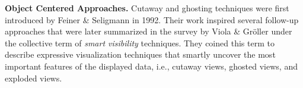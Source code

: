 \noindent
\textbf{Object Centered Approaches.}
Cutaway and ghosting techniques were first introduced by Feiner \& Seligmann \cite{feiner92} in 1992.
Their work inspired several follow-up approaches \cite{diep02, diep03, weiskopf03, viola2004importance, Viola05, Kruger05} that were later summarized in the survey by Viola \& Gr{\"o}ller \cite{violasmart05} under the collective term of \textit{smart visibility} techniques. They coined this term to describe expressive visualization techniques that smartly uncover the most important features of the displayed data, i.e., cutaway views, ghosted views, and exploded views. 

